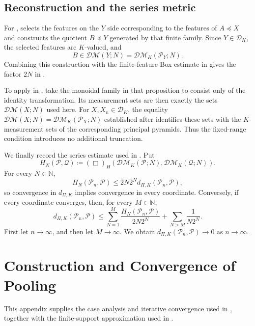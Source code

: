 \documentclass[10pt,a4paper]{amsart}
\newcommand{\DK}{\mathcal D_K}
\newcommand{\DM}{\mathcal{DM}}
\begin{document}
\subsection{Reconstruction and the series metric}
\label{subsec:app-pyramid-reconstruction}

For , \cite[Lemma~6.10]{gds2} selects the features on the $Y$ side corresponding to the features of $A\preceq X$ and constructs the quotient $B\preceq Y$ generated by that finite family. Since $Y\in\DK$, the selected features are $K$-valued, and
\[
B\in\DM(Y;N)=\DM_K(\mathcal P_Y;N).
\]
Combining this construction with the finite-feature Box estimate in \cite[Proposition~6.8]{gds2} gives the factor $2N$ in .

To apply \cite[Proposition~6.24]{gds2} in , take the monoidal family in that proposition to consist only of the identity transformation. Its measurement sets are then exactly the sets $\DM(X;N)$ used here. For $X,X_n\in\DK$, the equality $\DM(X;N)=\DM_K(\mathcal P_X;N)$ established after  identifies these sets with the $K$-measurement sets of the corresponding principal pyramids. Thus the fixed-range condition introduces no additional truncation.

We finally record the series estimate used in . Put
\[
H_N(\mathcal P,\mathcal Q)\coloneqq(\Box)_H(\DM_K(\mathcal P;N),\DM_K(\mathcal Q;N)).
\]
For every $N\in\mathbb N$,
\[
H_N(\mathcal P_n,\mathcal P)\leq2N2^N d_{\Pi,K}(\mathcal P_n,\mathcal P),
\]
so convergence in $d_{\Pi,K}$ implies convergence in every coordinate. Conversely, if every coordinate converges, then, for every $M\in\mathbb N$,
\[
d_{\Pi,K}(\mathcal P_n,\mathcal P)\leq\sum_{N=1}^{M}\frac{H_N(\mathcal P_n,\mathcal P)}{2N2^N}+\sum_{N>M}\frac{1}{N2^N}.
\]
First let $n\to\infty$, and then let $M\to\infty$. We obtain $d_{\Pi,K}(\mathcal P_n,\mathcal P)\to0$ as $n\to\infty$.

\section{Construction and Convergence of Pooling}
\label{app:pooling}

This appendix supplies the case analysis and iterative convergence used in , together with the finite-support approximation used in .
\end{document}
